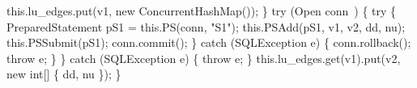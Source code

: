 \documentclass{article}
\def\nwendcode{\endtrivlist \endgroup}      %
\let\nwdocspar=\par
\theoremstyle{definition}                   %
\begin{document}
    this.lu_edges.put(v1, new ConcurrentHashMap());
  \}
  try (\LA{}Open \code{}conn\edoc{}~{\nwtagstyle{}}\RA{}) \{
    try \{
      PreparedStatement pS1 = this.PS(conn, "S1");
      this.PSAdd(pS1, v1, v2, dd, nu);
      this.PSSubmit(pS1);
      conn.commit();
    \} catch (SQLException e) \{
      conn.rollback();
      throw e;
    \}
  \} catch (SQLException e) \{
    throw e;
  \}
  this.lu_edges.get(v1).put(v2, new int[] \{ dd, nu \});
\}
\eatline
{}\nwendcode{}\nwdocspar
\end{document}
